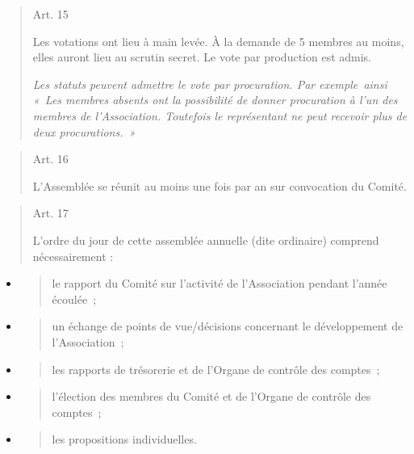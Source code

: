 \documentclass[10pt]{article}
\begin{document}
\begin{quote}
Art. 15

Les votations ont lieu à main levée. À la demande de 5 membres au moins,
elles auront lieu au scrutin secret. Le vote par production est admis.

\emph{Les statuts peuvent admettre le vote par procuration. Par
exemple~ainsi «~Les membres absents ont la possibilité de donner
procuration à l'un des membres de l'Association. Toutefois le
représentant ne peut recevoir plus de deux procurations.~»}

\end{quote}
\begin{quote}
Art. 16

L'Assemblée se réunit au moins une fois par an sur convocation du
Comité.

\end{quote}
\begin{quote}
Art. 17

L'ordre du jour de cette assemblée annuelle (dite ordinaire) comprend
nécessairement :
\end{quote}

\begin{itemize}
\item
  \begin{quote}
  le rapport du Comité sur l'activité de l'Association pendant l'année
  écoulée~;
  \end{quote}
\item
  \begin{quote}
  un échange de points de vue/décisions concernant le développement de
  l'Association~;
  \end{quote}
\item
  \begin{quote}
  les rapports de trésorerie et de l'Organe de contrôle des comptes~;
  \end{quote}
\item
  \begin{quote}
  l'élection des membres du Comité et de l'Organe de contrôle des
  comptes~;
  \end{quote}
\item
  \begin{quote}
  les propositions individuelles.
  \end{quote}
\end{itemize}
\end{document}
